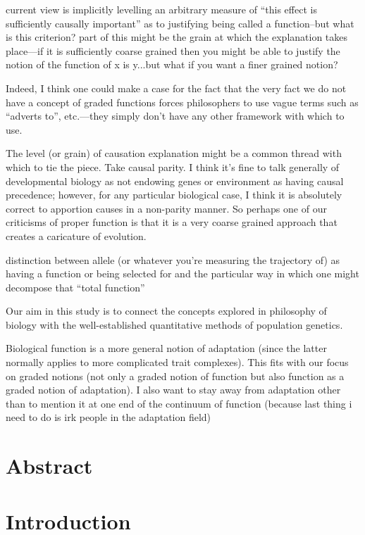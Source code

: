 \documentclass{article}
\begin{document}
  current view is implicitly levelling an arbitrary measure of ``this effect is sufficiently causally important'' as to justifying being called a function--but what is this criterion?
  part of this might be the grain at which the explanation takes place---if it is sufficiently coarse grained then you might be able to justify the notion of the function of x is y...but what if you want a finer grained notion?

  Indeed, I think one could make a case for the fact that the very fact we do not have a concept of graded functions forces philosophers to use vague terms such as ``adverts to'', etc.---they simply don't have any other framework with which to use.

The level (or grain) of causation explanation might be a common thread with which to tie the piece. Take causal parity. I think it's fine to talk generally of developmental biology as not endowing genes or environment as having causal precedence; however, for any particular biological case, I think it is absolutely correct to apportion causes in a non-parity manner. So perhaps one of our criticisms of proper function is that it is a very coarse grained approach that creates a caricature of evolution. 

distinction between allele (or whatever you're measuring the trajectory of) as having a function or being selected for and the particular way in which one might decompose that ``total function''
  
Our aim in this study is to connect the concepts explored in philosophy of biology with the well-established quantitative methods of population genetics.

Biological function is a more general notion of adaptation (since the latter normally applies to more complicated trait complexes). This fits with our focus on graded notions (not only a graded notion of function but also function as a graded notion of adaptation). I also want to stay away from adaptation other than to mention it at one end of the continuum of function (because last thing i need to do is irk people in the adaptation field)

\section{Abstract}
\label{sec:abstract}

\section{Introduction}
\label{sec:introduction}
\end{document}
